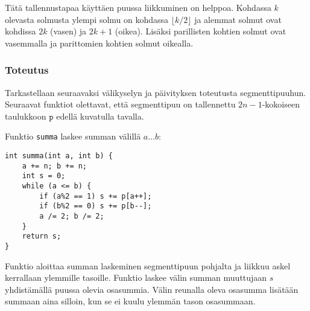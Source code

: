 \begin{center}
\end{center}

Tätä tallennustapaa käyttäen puussa liikkuminen on helppoa.
Kohdassa $k$ olevasta solmusta ylempi solmu on kohdassa
$\lfloor k/2 \rfloor$ ja alemmat solmut ovat kohdissa
$2k$ (vasen) ja $2k+1$ (oikea).
Lisäksi parillisten kohtien solmut ovat vasemmalla
ja parittomien kohtien solmut oikealla.

\subsubsection{Toteutus}

Tarkastellaan seuraavaksi välikyselyn ja päivityksen
toteutusta segmenttipuuhun.
Seuraavat funktiot olettavat, että segmenttipuu
on tallennettu $2n-1$-kokoi\-seen taulukkoon $\texttt{p}$
edellä kuvatulla tavalla.

Funktio \texttt{summa} laskee summan
välillä $a \ldots b$:

\begin{lstlisting}
int summa(int a, int b) {
    a += n; b += n;
    int s = 0;
    while (a <= b) {
        if (a%2 == 1) s += p[a++];
        if (b%2 == 0) s += p[b--];
        a /= 2; b /= 2;
    }
    return s;
}
\end{lstlisting}

Funktio aloittaa summan laskeminen segmenttipuun
pohjalta ja liikkuu askel kerrallaan ylemmille tasoille.
Funktio laskee välin summan muuttujaan $s$
yhdistämällä puussa olevia osasummia.
Välin reunalla oleva osasumma lisätään summaan
aina silloin, kun se ei kuulu ylemmän tason osasummaan.


